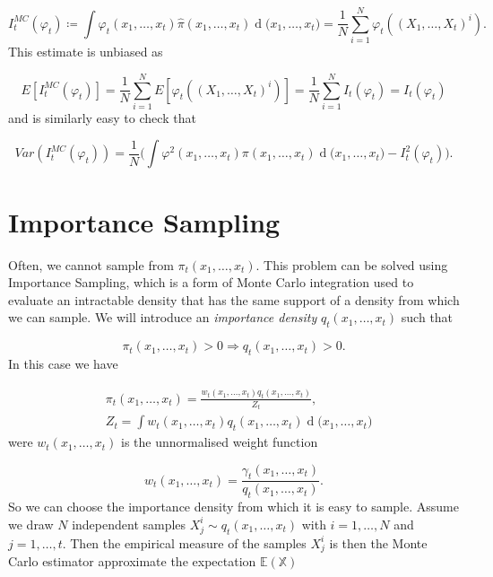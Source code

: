 \documentclass[11pt,a4paper]{article}
\renewcommand{\d}[1]{\ensuremath{\operatorname{d}\!{#1}}}
\begin{document}
\begin{equation*}
    I^{MC}_t(\varphi_t) \coloneqq \int \varphi_t(x_1, \dots, x_t) \hat{\pi} (x_1, \dots, x_t) \d (x_1, \dots, x_t) = \frac{1}{N} \sum_{i=1}^N \varphi_t((X_1, \dots, X_t)^i).
\end{equation*}
This estimate is unbiased as

\begin{equation*}
    E[I^{MC}_t(\varphi_t)] = \frac{1}{N}\sum_{i=1}^N E[\varphi_t((X_1, \dots, X_t)^i)] = \frac{1}{N} \sum_{i=1}^N I_t(\varphi_t) = I_t(\varphi_t)
\end{equation*}
and is similarly easy to check that

\begin{equation*}
    Var(I^{MC}_t(\varphi_t)) = \frac{1}{N} \bigg( \int \varphi^2(x_1, \dots, x_t) \pi(x_1, \dots, x_t) \d (x_1, \dots, x_t) - I^2_t(\varphi_t)\bigg).
\end{equation*}

\section{Importance Sampling}

Often, we cannot sample from $\pi_t (x_1, \dots, x_t)$. This problem can be solved using Importance Sampling, which is a form of Monte Carlo integration used to evaluate an intractable density that has the same support of a density from which we can sample. We will introduce an \textit{importance density} $q_t(x_1, \dots, x_t)$ such that

\begin{equation*}
    \pi_t(x_1, \dots, x_t) > 0 \Rightarrow q_t(x_1, \dots, x_t) > 0.
\end{equation*}
In this case we have

\begin{align*}
    &\pi_t(x_1, \dots, x_t) = \frac{w_t(x_1, \dots, x_t)q_t(x_1, \dots, x_t)}{Z_t}, \\
    &Z_t = \int w_t(x_1, \dots, x_t)q_t(x_1, \dots, x_t) \d (x_1, \dots, x_t)
\end{align*}
were $w_t(x_1, \dots, x_t)$ is the unnormalised weight function

\begin{equation*}
    w_t(x_1, \dots, x_t) = \frac{\gamma_t(x_1, \dots, x_t)}{q_t(x_1, \dots, x_t)}.
\end{equation*}
So we can choose the importance density from which it is easy to sample. Assume we draw $N$ independent samples $X^i_j \sim q_t(x_1, \dots, x_t)$ with $i = 1, \dots, N$ and $j = 1, \dots, t$. Then the empirical measure of the samples $X^i_j$ is  then the Monte Carlo estimator approximate the expectation $\mathbb{E(X)}$
\end{document}
